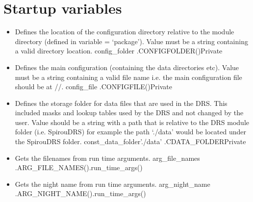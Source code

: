 \ifdevguide
\clearpage
\newpage
\section{Startup variables}
\label{ch:variables:startup}

\begin{itemize}


\item {} 
{Defines the location of the configuration directory relative to the module directory (defined in variable = `package'). Value must be a string containing a valid directory location.}
{config\_folder}{\configdirrelpath}
{\AllRecipes}{\spirouConst.CONFIGFOLDER()}{\AllRecipes}{Private}


\item {} 
{Defines the main configuration (containing the data directories etc).  Value must be a string containing a valid file name i.e. the main configuration file should be at //.}
{config\_file}{\configtxtfile}
{\AllRecipes}{\spirouConst.CONFIGFILE()}{\AllRecipes}{Private}


\item {} 
{Defines the storage folder for data files that are used in the DRS. This included masks and lookup tables used by the DRS and not changed by the user. Value should be a string with a path that is relative to the DRS module folder (i.e. SpirouDRS) for example the path `./data' would be located under the SpirouDRS folder.}
{const\_data\_folder}{'./data'}
{\AllRecipes}{\spirouConst.CDATA\_FOLDER}{\AllRecipes}{Private}


\item {} 
{Gets the filenames from run time arguments.}
{arg\_file\_names}
{\AllRecipes}{\spirouConst.ARG\_FILE\_NAMES()}{\spirouStartup.run\_time\_args()}


\item {} 
{Gets the night name from run time arguments.}
{arg\_night\_name}
{\AllRecipes}{\spirouConst.ARG\_NIGHT\_NAME()}{\spirouStartup.run\_time\_args()}



\end{itemize}
